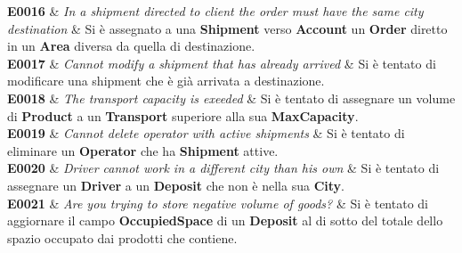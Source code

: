 {  \textbf{E0016} &
  {\footnotesize
    \textit{In a shipment directed to client the order must have the same city destination}
  } &
  {\footnotesize
    Si è assegnato a una \textbf{Shipment} verso \textbf{Account} un \textbf{Order} diretto in un \textbf{Area} diversa da quella di destinazione.} \\

  \textbf{E0017} &
  {\footnotesize
    \textit{Cannot modify a shipment that has already arrived} } &
  {\footnotesize
    Si è tentato di modificare una shipment che è già arrivata a destinazione.} \\

  \textbf{E0018} &
  {\footnotesize
    \textit{The transport capacity is exeeded} } &
  {\footnotesize
    Si è tentato di assegnare un volume di \textbf{Product} a un \textbf{Transport} superiore alla sua \textbf{MaxCapacity}.} \\

  \textbf{E0019} &
  {\footnotesize
    \textit{Cannot delete operator with active shipments} } &
  {\footnotesize
    Si è tentato di eliminare un \textbf{Operator} che ha \textbf{Shipment} attive.} \\

  \textbf{E0020} &
  {\footnotesize
    \textit{Driver cannot work in a different city than his own} } &
  {\footnotesize
    Si è tentato di assegnare un \textbf{Driver} a un \textbf{Deposit} che non è nella sua \textbf{City}.} \\

  \textbf{E0021} &
  {\footnotesize
    \textit{Are you trying to store negative volume of goods?} } &
  {\footnotesize
    Si è tentato di aggiornare il campo \textbf{OccupiedSpace} di un \textbf{Deposit} al di sotto del totale dello spazio occupato dai prodotti che contiene.} \\
}
